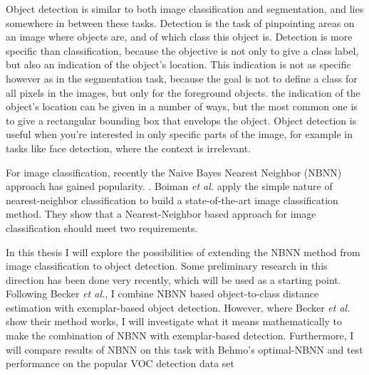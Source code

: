 \documentclass[a4paper,10pt]{article}
\begin{document}
Object detection is similar to both image classification and segmentation, and lies somewhere in between these tasks. Detection is the task of pinpointing areas on an image where objects are, and of which class this object is. Detection is more specific than classification, because the objective is not only to give a class label, but also an indication of the object's location. This indication is not as specific however as in the segmentation task, because the goal is not to define a class for all pixels in the images, but only for the foreground objects. the indication of the object's location can be given in a number of ways, but the most common one is to give a rectangular bounding box that envelops the object. Object detection is useful when you're interested in only specific parts of the image, for example in tasks like face detection, where the context is irrelevant. 


For image classification, recently the Naive Bayes Nearest Neighbor (NBNN) \cite{boiman2008defense} approach has gained popularity. . Boiman \emph{et al.} apply the simple nature of nearest-neighbor classification to build a state-of-the-art image classification method. They show that a Nearest-Neighbor based approach for image classification should meet two requirements. 

In this thesis I will explore the possibilities of extending the NBNN method from image classification to object detection. Some preliminary research in this direction has been done very recently\cite{becker2012codebook}, which will be used as a starting point. Following Becker \emph{et al.}\cite{becker2012codebook}, I combine NBNN based object-to-class distance estimation with exemplar-based object detection\cite{chum2007exemplar}. However, where Becker \emph{et al.} show their method works, I will investigate what it means mathematically to make the combination of NBNN with exemplar-based detection. Furthermore, I will compare results of NBNN on this task with Behmo's optimal-NBNN\cite{behmo2010towards} and test performance on the popular VOC detection data set 
\end{document}
